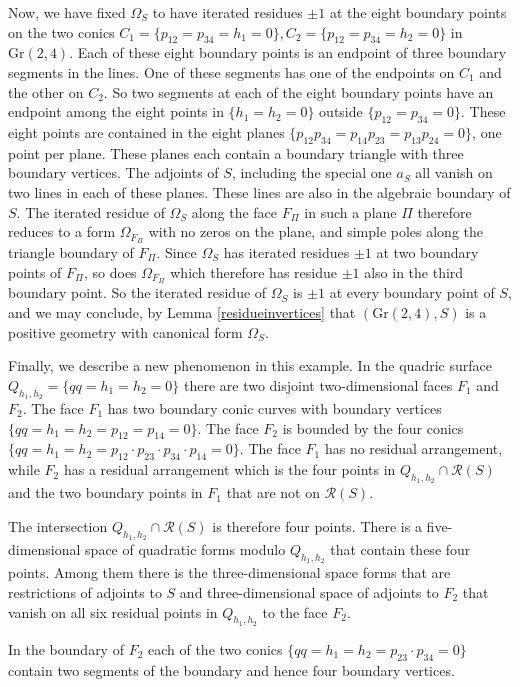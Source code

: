 \documentclass[12pt]{extarticle}
\theoremstyle{definition}
\newenvironment{example}
{\pushQED{\qed}\renewcommand{\qedsymbol}{$\diamond$}\examplex}
{\popQED\endexamplex}
\begin{document}
\begin{example}
 Now, we have fixed $\Omega_S$ to have iterated residues $\pm 1$ at the eight boundary points on the two conics $C_1=\{p_{12}=p_{34}=h_1=0\},C_2=\{p_{12}=p_{34}=h_2=0\}$ in $\mathrm{Gr}(2,4)$. 
 Each of these eight boundary points is an endpoint of three boundary segments in the lines. One of these segments has one of the endpoints on $C_1$ and the other on $C_2$. So two segments at each of the eight boundary points have an endpoint among the eight points in $\{h_1=h_2=0\}$ outside $\{p_{12}=p_{34}=0\}$. These eight points are contained in the eight planes $\{p_{12}p_{34}=p_{14}p_{23}=p_{13}p_{24}=0\}$, one point per plane. These planes each contain a boundary triangle with three boundary vertices. The adjoints of $S$, including the special one $a_S$ all vanish on two lines in each of these planes. These lines are also in the algebraic boundary of $S$. The iterated residue of $\Omega_S$ along the face $F_\Pi$ in such a plane $\Pi$ therefore reduces to a form $\Omega_{F_\Pi}$ with no zeros on the plane, and simple poles along the triangle boundary of $F_\Pi$. Since $\Omega_S$ has iterated residues $\pm 1$ at two boundary points of $F_\Pi$, so does $\Omega_{F_\Pi}$ which therefore has residue $\pm 1$ also in the third boundary point. So the iterated residue of $\Omega_S$ is $\pm 1$ at every boundary point of $S$, and we may conclude, by Lemma \ref{residueinvertices} that $(\mathrm{Gr}(2,4),S)$ is a positive geometry with canonical form $\Omega_S$.

Finally, we describe a new phenomenon in this example. 
In the quadric surface $Q_{h_1,h_2}=\{qq=h_1=h_2=0\}$ there are two disjoint two-dimensional faces $F_1$ and $F_2$.  The face $F_1$ has two boundary conic curves with boundary vertices $\{qq=h_1=h_2=p_{12}=p_{14}=0\}$.  The face $F_2$ is bounded by the four conics $\{qq=h_1=h_2=p_{12}\cdot p_{23}\cdot p_{34}\cdot p_{14}=0\}.$
The face $F_1$ has no residual arrangement, while $F_2$ has a residual arrangement which is the four points in 
$Q_{h_1,h_2}\cap\mathcal{R}(S)$ and the two boundary points in $F_1$ that are not on $\mathcal{R}(S)$. 

The intersection $Q_{h_1,h_2}\cap\mathcal{R}(S)$ is therefore four points. There is a five-dimensional space of quadratic forms modulo $Q_{h_1,h_2}$ that contain these four points. Among them there is the three-dimensional space forms that are restrictions of adjoints to $S$ and
three-dimensional space of adjoints to $F_2$ that vanish on all six residual points in $Q_{h_1,h_2}$ to the face $F_2$. 

In the boundary of $F_2$ each of the two conics $\{qq=h_1=h_2= p_{23}\cdot p_{34}=0\}$ contain two segments of the boundary and hence four boundary vertices. 


\end{example}
\end{document}
